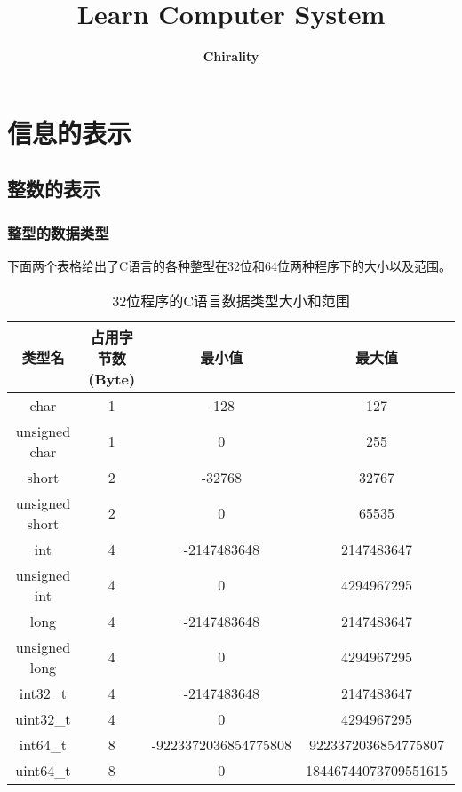\documentclass[utf8]{ctexart} %
\title{\textbf{Learn Computer System}}
\author{\bf Chirality}
\date{}
\begin{document}
\maketitle
\newpage
\renewcommand{\contentsname}{目录} 
\tableofcontents
\newpage 
\section{信息的表示}
\subsection{整数的表示}
\subsubsection{整型的数据类型}
下面两个表格给出了C语言的各种整型在32位和64位两种程序下的大小以及范围。
\begin{table}[h!]
	\begin{center}
		\begin{tabular}{c|c|c|c}
			\textbf{类型名} & \textbf{占用字节数(Byte)} & \textbf{最小值} & \textbf{最大值} \\
			\hline
			char & 1 & -128 & 127\\
			\hline
			unsigned char & 1 & 0 & 255\\
			\hline
			short & 2 & -32768 & 32767\\
			\hline
			unsigned short & 2 & 0 & 65535\\
			\hline
			int & 4 & -2147483648 & 2147483647\\
			\hline
			unsigned int & 4 & 0 & 4294967295\\
			\hline
			long & 4 & -2147483648 & 2147483647\\
			\hline
			unsigned long & 4 & 0 & 4294967295\\
			\hline
			int32\_t & 4 & -2147483648 & 2147483647\\
			\hline
			uint32\_t & 4 & 0 & 4294967295\\
			\hline
			int64\_t & 8 & -9223372036854775808 & 9223372036854775807\\
			\hline
			uint64\_t & 8 & 0 & 18446744073709551615\\
			\hline
		\end{tabular}
	\caption{32位程序的C语言数据类型大小和范围}
	\end{center}
\end{table}
\end{document}
